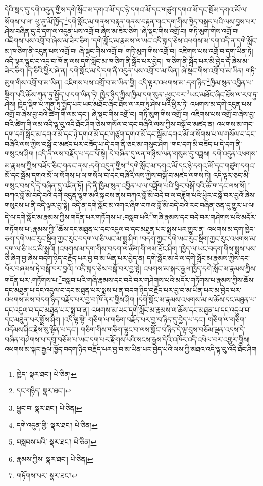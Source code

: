 དེའི་སླད་དུ་དགེ་འདུན་གྱིས་དགེ་སློང་མ་དགའ་མོ་དང་ཉེ་དགའ་མོ་དང་གཙུག་དགའ་མོ་དང་སྦོམ་དགའ་མོ་ལ་སོགས་པ་ལ། ཕུ་ནུ་མོ་ཁྱོད་\footnote{ཁྱེད་  སྣར་ཐང་།  པེ་ཅིན། }དགེ་སློང་མ་གནས་བརྟན་གནས་བརྟན་གང་དག་གིས་ཁྱེད་བསྐྲད་པའི་ལས་བྱས་པར་ཤེས་བཞིན་དུ་དེ་དག་ལ་འདུན་པས་འགྲོ་བ་ཞེས་མ་ཟེར་ཅིག །ཞེ་སྡང་གིས་འགྲོ་བ། གཏི་མུག་གིས་འགྲོ་བ། འཇིགས་པས་འགྲོ་བ་ཞེས་མ་ཟེར་ཅིག །དགེ་སློང་མ་རྣམས་ལ་ཡང་འདི་སྐད་ཅེས་འཕགས་མ་དག་འདི་ན་དགེ་སློང་མ་ཁ་ཅིག་ནི་འདུན་པས་འགྲོ་བ། ཞེ་སྡང་གིས་འགྲོ་བ། གཏི་མུག་གིས་འགྲོ་བ། འཇིགས་པས་འགྲོ་བ་དག་ཡིན་ཏེ། འདི་ལྟར་ལྟུང་བ་འདྲ་བ་ཁོ་ན་ལས་དགེ་སློང་མ་ཁ་ཅིག་ནི་སྐྲོད་པར་བྱེད། ཁ་ཅིག་ནི་སྐྲོད་པར་མི་བྱེད་དོ་ཞེས་མ་ཟེར་ཅིག །དེ་ཅིའི་ཕྱིར་ཞེ་ན། དགེ་སློང་མ་དེ་དག་ནི་འདུན་པས་འགྲོ་བ་མ་ཡིན། ཞེ་སྡང་གིས་འགྲོ་བ་མ་ཡིན། གཏི་མུག་གིས་འགྲོ་བ་མ་ཡིན། འཇིགས་པས་འགྲོ་བ་མ་ཡིན་གྱི། འདི་ལྟར་འཕགས་མ་:དག་ཉིད་\footnote{དང་གཉིད་  སྣར་ཐང་། }ཁྱིམ་སུན་འབྱིན་པ་སྡིག་པའི་ཆོས་ཀུན་ཏུ་སྤྱོད་པ་དག་ཡིན་ཏེ། ཁྱེད་ཉིད་ཀྱིས་ཁྱིམ་དག་སུན་:ཕྱུང་བར་\footnote{ཕྱུང་བ་  སྣར་ཐང་།  པེ་ཅིན། }ཡང་མཐོང་ཞིང་ཐོས་ལ་རབ་ཏུ་ཤེས། ཁྱེད་སྡིག་པ་ཀུན་ཏུ་སྤྱོད་པར་ཡང་མཐོང་ཞིང་ཐོས་ལ་རབ་ཏུ་ཤེས་པའི་ཕྱིར་ཏེ། འཕགས་མ་དགེ་འདུན་པས་འགྲོ་བ་ཞེས་བྱ་བའི་ཚིག་གི་ལམ་དང་། ཞེ་སྡང་གིས་འགྲོ་བ། གཏི་མུག་གིས་འགྲོ་བ། འཇིགས་པས་འགྲོ་བ་ཞེས་བྱ་བའི་ཚིག་གི་ལམ་འདི་ལྟ་བུ་འདི་ཐོང་ཤིག་ཅེས་གསོལ་བ་དང་བཞིའི་ལས་ཀྱིས་བསྒོ་བ་མཛད་ན། འཕགས་མ་གང་དག་དགེ་སློང་མ་དགའ་མོ་དང་ཉེ་དགའ་མོ་དང་གཙུག་དགའ་མོ་དང་སྦོམ་དགའ་མོ་ལ་སོགས་པ་ལ་གསོལ་བ་དང་བཞིའི་ལས་ཀྱིས་བསྒོ་བ་མཛད་པར་བཟོད་པ་དེ་དག་ནི་ཅང་མ་གསུང་ཤིག །གང་དག་མི་བཟོད་པ་དེ་དག་ནི་གསུངས་ཤིག །འདི་ནི་ལས་བརྗོད་པ་དང་པོ་སྟེ། དེ་བཞིན་དུ་ལན་གཉིས་ལན་གསུམ་དུ་བཟླས། དགེ་འདུན་འཕགས་མ་རྣམས་ཀྱིས་བཟོད་ཅིང་གནང་ནས་:དགེ་འདུན་གྱིས་\footnote{དགེ་འདུན་གྱི་  སྣར་ཐང་།  པེ་ཅིན། }དགེ་སློང་མ་དགའ་མོ་དང་ཉེ་དགའ་མོ་དང་གཙུག་དགའ་མོ་དང་སྦོམ་དགའ་མོ་ལ་སོགས་པ་ལ་གསོལ་བ་དང་བཞིའི་ལས་ཀྱིས་བསྒོ་བ་མཛད་ལགས་ཏེ། འདི་ལྟར་ཅང་མི་གསུང་བས་དེ་དེ་བཞིན་དུ་འཛིན་ཏོ། །དེ་ནི་ཁྱིམ་སུན་འབྱིན་པ་ལ་བཟློག་པའི་ཕྱིར་བསྒོ་བའི་ཆོ་ག་དང་ལས་སོ། །བཀའ་བློ་མི་བདེ་བའི་དགེ་འདུན་ལྷག་མའི་སྐབས་ནས་བཀའ་བློ་མི་བདེ་བ་ལ་བཟློག་པའི་ཕྱིར་བསྒོ་བར་བྱའོ་ཞེས་གསུངས་པ་ནི་འདི་ལྟར་བྱ་སྟེ། འདི་ན་དགེ་སློང་མ་འགའ་ཞིག་བཀའ་བློ་མི་བདེ་བའི་རང་བཞིན་ཅན་དུ་གྱུར་པ་ལ། དེ་ལ་དགེ་སློང་མ་རྣམས་ཀྱིས་གདོན་པར་གཏོགས་པ་:བསླབ་པའི་\footnote{བསླབས་པའི་  སྣར་ཐང་།  པེ་ཅིན། }གཞི་རྣམས་དང་བདེ་བར་གཤེགས་པའི་མདོར་གཏོགས་པ་:རྣམས་ཀྱི་\footnote{རྣམས་ཀྱིས་  སྣར་ཐང་།  པེ་ཅིན། }ཆོས་དང་མཐུན་པ་དང་འདུལ་བ་དང་མཐུན་པར་སྨྲས་པར་གྱུར་ན། འཕགས་མ་དག་ཁྱེད་ཅག་དགེ་ཡང་རུང་སྡིག་ཀྱང་རུང་བདག་ལ་ཅི་ཡང་མ་སྨྲ་ཤིག །བདག་ཀྱང་དགེ་ཡང་རུང་སྡིག་ཀྱང་རུང་འཕགས་མ་དག་ལ་ཅི་ཡང་མི་སྨྲའོ། །འཕགས་མ་དག་གིས་བདག་ལ་ཚིག་གི་ལམ་ཐོང་ཤིག །ཁྱེད་ལ་ཡང་བདག་གིས་སྨྲས་པས་ཅི་ཞིག་བྱ་ཞེས་བདག་ཉིད་བརྗོད་པར་བྱ་བ་མ་ཡིན་པར་བྱེད་ན། དགེ་སློང་མ་དེ་ལ་དགེ་སློང་མ་རྣམས་ཀྱིས་དང་པོར་བཞམས་ཏེ་བསྒོ་བར་བྱའོ། །འདི་སྐད་ཅེས་བསྒོ་བར་བྱ་སྟེ། འཕགས་མ་སྐར་རྒྱལ་ཁྱོད་དགེ་སློང་མ་རྣམས་ཀྱིས་གདོན་པར་:གཏོགས་པ་\footnote{གཏོགས་པར་  སྣར་ཐང་། }བསླབ་པའི་གཞི་རྣམས་དང་བདེ་བར་གཤེགས་པའི་མདོར་གཏོགས་པ་རྣམས་ཀྱིས་ཆོས་དང་མཐུན་པ་དང་འདུལ་བ་དང་མཐུན་པར་སྨྲས་པ་ན་བདག་ཉིད་བརྗོད་པར་བྱ་བ་མ་ཡིན་པར་མ་བྱེད་པར་འཕགས་མས་བདག་ཉིད་བརྗོད་པར་བྱ་བ་ཁོ་ནར་གྱིས་ཤིག །དགེ་སློང་མ་རྣམས་འཕགས་མ་ལ་ཆོས་དང་མཐུན་པ་དང་འདུལ་བ་དང་མཐུན་པར་སྨྲ་བ་ན། འཕགས་མ་ཡང་དགེ་སློང་མ་རྣམས་ལ་ཆོས་དང་མཐུན་པ་དང་འདུལ་བ་དང་མཐུན་པར་སྨྲོས་ཤིག །འདི་ལྟ་སྟེ། གཅིག་ལ་གཅིག་བརྗོད་པར་བྱ་བ་ཉིད་དུ་བྱེད་པ་དང་། གཅིག་ལ་གཅིག་འདོམས་ཤིང་རྗེས་སུ་སྟོན་པ་དང་། གཅིག་གིས་གཅིག་ལྟུང་བ་ལས་སློང་བ་ཉིད་དེ་ལྟ་བུས་བཅོམ་ལྡན་འདས་དེ་བཞིན་གཤེགས་པ་དགྲ་བཅོམ་པ་ཡང་དག་པར་རྫོགས་པའི་སངས་རྒྱས་དེའི་འཁོར་འདི་འཕེལ་བར་འགྱུར་གྱིས། འཕགས་མ་སྐར་རྒྱལ་ཁྱོད་བདག་ཉིད་བརྗོད་པར་བྱ་བ་མ་ཡིན་པར་བྱེད་པའི་ལས་ཀྱི་མཐའ་འདི་ལྟ་བུ་འདི་ཐོང་ཤིག 